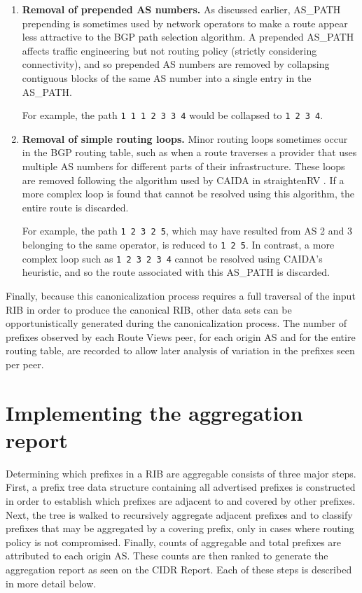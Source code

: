 \begin{enumerate}
    \item{\textbf{Removal of prepended AS numbers.} As discussed earlier,
    AS\_PATH prepending is sometimes used by network operators to make a route
    appear less attractive to the BGP path selection algorithm. A prepended
    AS\_PATH affects traffic engineering but not routing policy (strictly
    considering connectivity), and so prepended AS numbers are removed by
    collapsing contiguous blocks of the same AS number into a single entry in
    the AS\_PATH.

    For example, the path \verb!1 1 1 2 3 3 4! would be collapsed to
    \verb!1 2 3 4!.}

    \item{\textbf{Removal of simple routing loops.} Minor routing loops
    sometimes occur in the BGP routing table, such as when a route traverses a
    provider that uses multiple AS numbers for different parts of their
    infrastructure. These loops are removed following the algorithm used by
    CAIDA in straightenRV \cite{straightenrv}. If a more complex loop is found
    that cannot be resolved using this algorithm, the entire route is
    discarded.

    For example, the path \verb!1 2 3 2 5!, which may have resulted from AS 2
    and 3 belonging to the same operator, is reduced to \verb!1 2 5!. In
    contrast, a more complex loop such as \verb!1 2 3 2 3 4! cannot be resolved
    using CAIDA's heuristic, and so the route associated with this AS\_PATH is
    discarded.}
\end{enumerate}

Finally, because this canonicalization process requires a full traversal of the
input RIB in order to produce the canonical RIB, other data sets can be
opportunistically generated during the canonicalization process. The number of
prefixes observed by each Route Views peer, for each origin AS and for the
entire routing table, are recorded to allow later analysis of variation in the
prefixes seen per peer.

\section{Implementing the aggregation report}

Determining which prefixes in a RIB are aggregable consists of three major
steps. First, a prefix tree data structure containing all advertised prefixes
is constructed in order to establish which prefixes are adjacent to and covered
by other prefixes. Next, the tree is walked to recursively aggregate adjacent
prefixes and to classify prefixes that may be aggregated by a covering prefix,
only in cases where routing policy is not compromised. Finally, counts of
aggregable and total prefixes are attributed to each origin AS. These counts
are then ranked to generate the aggregation report as seen on the CIDR Report.
Each of these steps is described in more detail below.

